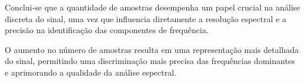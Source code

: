 Conclui-se que a quantidade de amostras desempenha um papel crucial na análise discreta do sinal, uma vez que influencia diretamente a resolução espectral e a precisão na identificação das componentes de frequência.

O aumento no número de amostras resulta em uma representação mais detalhada do sinal, permitindo uma discriminação mais precisa das frequências dominantes e aprimorando a qualidade da análise espectral.
